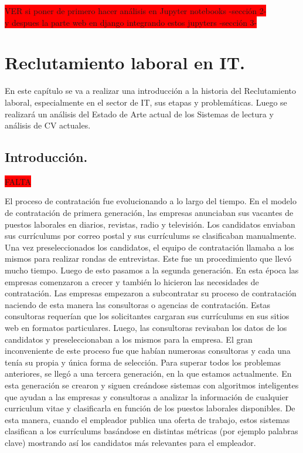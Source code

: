 \documentclass[12pt,a4paper]{article}
\begin{document}
\colorbox{red}{VER si poner de primero hacer análisis en Jupyter notebooks -sección 2-}\\
\colorbox{red}{y despues la parte web en django integrando estos jupyters -sección 3-}\\

\cleardoublepage    %

\section{Reclutamiento laboral en IT.}
En este capítulo se va a realizar una introducción a la historia del Reclutamiento laboral, especialmente en el sector de IT, sus etapas y problemáticas.
Luego se realizará un análisis del Estado de Arte actual de los Sistemas de lectura y análisis de CV actuales.

\subsection{Introducción.}
\colorbox{red}{FALTA}

El proceso de contratación fue evolucionando a lo largo del tiempo. En el modelo de contratación de primera generación, las empresas anunciaban sus vacantes de puestos laborales en diarios, revistas, radio y televisión. Los candidatos enviaban sus currículums por correo postal y sus currículums se clasificaban manualmente. Una vez preseleccionados los candidatos, el equipo de contratación llamaba a los mismos para realizar rondas de entrevistas. Este fue un procedimiento que llevó mucho tiempo.
Luego de esto pasamos a la segunda generación. En esta época las empresas comenzaron a crecer y también lo hicieron las necesidades de contratación. Las empresas empezaron a subcontratar su proceso de contratación naciendo de esta manera las consultoras o agencias de contratación. Estas consultoras requerían que los solicitantes cargaran sus currículums en sus sitios web en formatos particulares. Luego, las consultoras revisaban los datos de los candidatos y preseleccionaban a los mismos para la empresa. El gran inconveniente de este proceso fue que habían numerosas consultoras y cada una tenía su propia y única forma de selección.
Para superar todos los problemas anteriores, se llegó a una tercera generación, en la que estamos actualmente. En esta generación se crearon y siguen creándose sistemas con algoritmos inteligentes que ayudan a las empresas y consultoras a analizar la información de cualquier curriculum vitae y clasificarla en función de los puestos laborales disponibles. De esta manera, cuando el empleador publica una oferta de trabajo, estos sistemas clasifican a los currículums basándose en distintas métricas (por ejemplo palabras clave) mostrando así los candidatos más relevantes para el empleador.
\end{document}
